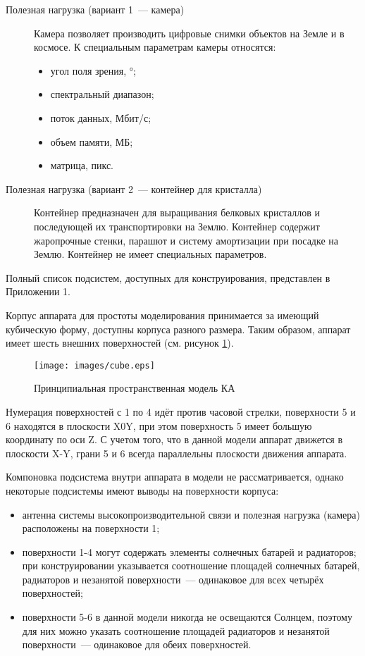 \documentclass[12pt,a4paper]{article}
\begin{document}
\begin{description}
\item [Полезная нагрузка (вариант 1~--- камера)] Камера позволяет производить цифровые
  снимки объектов на Земле и в космосе. К специальным параметрам камеры относятся:
  \begin{itemize}
  \item угол поля зрения, °;
  \item спектральный диапазон;
  \item поток данных, Мбит/с;
  \item объем памяти, МБ;
  \item матрица, пикс.
  \end{itemize}

\item [Полезная нагрузка (вариант 2~--- контейнер для кристалла)] Контейнер предназначен
  для выращивания белковых кристаллов и последующей их транспортировки на Землю. Контейнер
  содержит жаропрочные стенки, парашют и систему амортизации при посадке на
  Землю. Контейнер не имеет специальных параметров.

\end{description}

Полный список подсистем, доступных для конструирования, представлен в Приложении 1.

Корпус аппарата для простоты моделирования принимается за имеющий кубическую форму,
доступны корпуса разного размера. Таким образом, аппарат имеет шесть внешних поверхностей
(см. рисунок \ref{Pic:cube}).

\begin{figure}[tbh]
  \begin{center}
    \texttt{[image: images/cube.eps]}
    \caption{Принципиальная пространственная модель КА}
    \label{Pic:cube}
  \end{center}
\end{figure}

Нумерация поверхностей с 1 по 4 идёт против часовой стрелки, поверхности 5 и 6 находятся в
плоскости X0Y, при этом поверхность 5 имеет большую координату по оси Z. С учетом того,
что в данной модели аппарат движется в плоскости X-Y, грани 5 и 6 всегда параллельны
плоскости движения аппарата.

Компоновка подсистема внутри аппарата в модели не рассматривается, однако некоторые
подсистемы имеют выводы на поверхности корпуса:

\begin{itemize}
\item антенна системы высокопроизводительной связи и полезная нагрузка (камера)
  расположены на поверхности 1;
\item поверхности 1-4 могут содержать элементы солнечных батарей и радиаторов; при
  конструировании указывается соотношение площадей солнечных батарей, радиаторов и
  незанятой поверхности~--– одинаковое для всех четырёх поверхностей;
\item поверхности 5-6 в данной модели никогда не освещаются Солнцем, поэтому для них можно
  указать соотношение площадей радиаторов и незанятой поверхности~--– одинаковое для обеих
  поверхностей.
\end{itemize}
\end{document}
